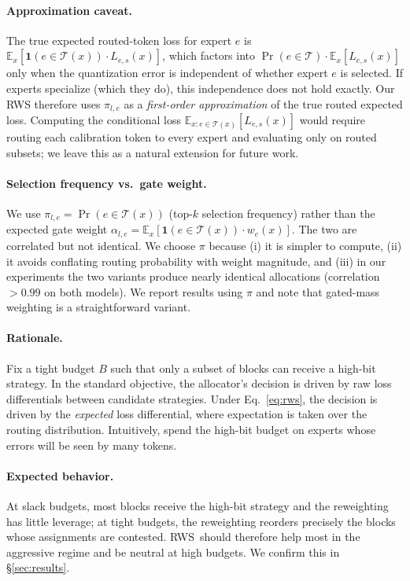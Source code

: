 \documentclass{article}
\newcommand{\method}{\textsc{RWS}\xspace}
\begin{document}
\paragraph{Approximation caveat.} The true expected routed-token loss for expert $e$ is $\mathbb{E}_x[\mathbf{1}(e \in \mathcal{T}(x)) \cdot L_{e,s}(x)]$, which factors into $\Pr(e \in \mathcal{T}) \cdot \mathbb{E}_x[L_{e,s}(x)]$ only when the quantization error is independent of whether expert $e$ is selected. If experts specialize (which they do), this independence does not hold exactly. Our RWS therefore uses $\pi_{l,e}$ as a \emph{first-order approximation} of the true routed expected loss. Computing the conditional loss $\mathbb{E}_{x: e \in \mathcal{T}(x)}[L_{e,s}(x)]$ would require routing each calibration token to every expert and evaluating only on routed subsets; we leave this as a natural extension for future work.

\paragraph{Selection frequency vs.\ gate weight.} We use $\pi_{l,e} = \Pr(e \in \mathcal{T}(x))$ (top-$k$ selection frequency) rather than the expected gate weight $\alpha_{l,e} = \mathbb{E}_x[\mathbf{1}(e \in \mathcal{T}(x)) \cdot w_e(x)]$. The two are correlated but not identical. We choose $\pi$ because (i) it is simpler to compute, (ii) it avoids conflating routing probability with weight magnitude, and (iii) in our experiments the two variants produce nearly identical allocations (correlation $> 0.99$ on both models). We report results using $\pi$ and note that gated-mass weighting is a straightforward variant.

\paragraph{Rationale.} Fix a tight budget $B$ such that only a subset of blocks can receive a high-bit strategy. In the standard objective, the allocator's decision is driven by raw loss differentials between candidate strategies. Under Eq.~\ref{eq:rws}, the decision is driven by the \emph{expected} loss differential, where expectation is taken over the routing distribution. Intuitively, spend the high-bit budget on experts whose errors will be seen by many tokens.

\paragraph{Expected behavior.} At slack budgets, most blocks receive the high-bit strategy and the reweighting has little leverage; at tight budgets, the reweighting reorders precisely the blocks whose assignments are contested. \method\ should therefore help most in the aggressive regime and be neutral at high budgets. We confirm this in \S\ref{sec:results}.
\end{document}
